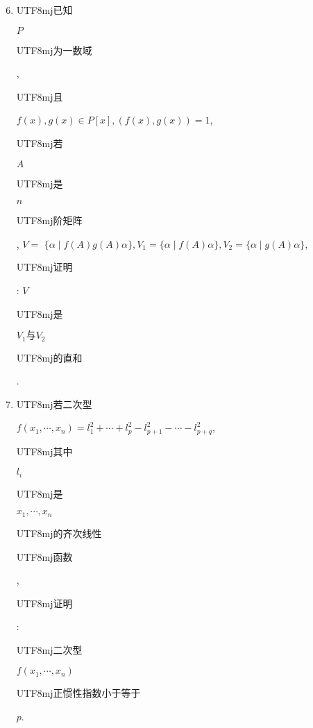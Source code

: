 \documentclass[10pt]{article}
\begin{document}
\begin{enumerate}
  \setcounter{enumi}{5}
  \item \begin{CJK}{UTF8}{mj}已知\end{CJK} $P$ \begin{CJK}{UTF8}{mj}为一数域\end{CJK}, \begin{CJK}{UTF8}{mj}且\end{CJK} $f(x), g(x) \in P[x],(f(x), g(x))=1$, \begin{CJK}{UTF8}{mj}若\end{CJK} $A$ \begin{CJK}{UTF8}{mj}是\end{CJK} $n$ \begin{CJK}{UTF8}{mj}阶矩阵\end{CJK}, $V=$ $\{\alpha \mid f(A) g(A) \alpha\}, V_{1}=\{\alpha \mid f(A) \alpha\}, V_{2}=\{\alpha \mid g(A) \alpha\}$, \begin{CJK}{UTF8}{mj}证明\end{CJK}: $V$ \begin{CJK}{UTF8}{mj}是\end{CJK} $V_{1} 与 V_{2}$ \begin{CJK}{UTF8}{mj}的直和\end{CJK}.

  \item \begin{CJK}{UTF8}{mj}若二次型\end{CJK} $f\left(x_{1}, \cdots, x_{n}\right)=l_{1}^{2}+\cdots+l_{p}^{2}-l_{p+1}^{2}-\cdots-l_{p+q}^{2}$, \begin{CJK}{UTF8}{mj}其中\end{CJK} $l_{i}$ \begin{CJK}{UTF8}{mj}是\end{CJK} $x_{1}, \cdots, x_{n}$ \begin{CJK}{UTF8}{mj}的齐次线性\end{CJK} \begin{CJK}{UTF8}{mj}函数\end{CJK}, \begin{CJK}{UTF8}{mj}证明\end{CJK}: \begin{CJK}{UTF8}{mj}二次型\end{CJK} $f\left(x_{1}, \cdots, x_{n}\right)$ \begin{CJK}{UTF8}{mj}正惯性指数小于等于\end{CJK} $p$.


\end{enumerate}
\end{document}
